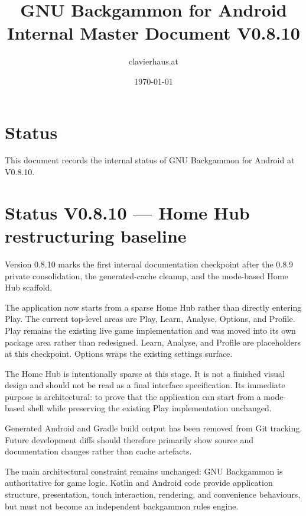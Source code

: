 \documentclass[11pt,a4paper]{article}
\title{GNU Backgammon for Android\\Internal Master Document V0.8.10}
\author{clavierhaus.at}
\date{\today}
\begin{document}
\maketitle

\section*{Status}

This document records the internal status of GNU Backgammon for Android at V0.8.10.



\section*{Status V0.8.10 --- Home Hub restructuring baseline}

Version 0.8.10 marks the first internal documentation checkpoint after the 0.8.9 private consolidation, the generated-cache cleanup, and the mode-based Home Hub scaffold.

The application now starts from a sparse Home Hub rather than directly entering Play. The current top-level areas are Play, Learn, Analyse, Options, and Profile. Play remains the existing live game implementation and was moved into its own package area rather than redesigned. Learn, Analyse, and Profile are placeholders at this checkpoint. Options wraps the existing settings surface.

The Home Hub is intentionally sparse at this stage. It is not a finished visual design and should not be read as a final interface specification. Its immediate purpose is architectural: to prove that the application can start from a mode-based shell while preserving the existing Play implementation unchanged.

Generated Android and Gradle build output has been removed from Git tracking. Future development diffs should therefore primarily show source and documentation changes rather than cache artefacts.

The main architectural constraint remains unchanged: GNU Backgammon is authoritative for game logic. Kotlin and Android code provide application structure, presentation, touch interaction, rendering, and convenience behaviours, but must not become an independent backgammon rules engine.
\end{document}
